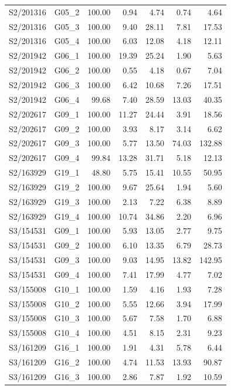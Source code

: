 \begin{longtable}{llrrrrr}
S2/201316 & G05\_2 & 100.00 & 0.94 & 4.74 & 0.74 & 4.64 \\
S2/201316 & G05\_3 & 100.00 & 9.40 & 28.11 & 7.81 & 17.53 \\
S2/201316 & G05\_4 & 100.00 & 6.03 & 12.08 & 4.18 & 12.11 \\
S2/201942 & G06\_1 & 100.00 & 19.39 & 25.24 & 1.90 & 5.63 \\
S2/201942 & G06\_2 & 100.00 & 0.55 & 4.18 & 0.67 & 7.04 \\
S2/201942 & G06\_3 & 100.00 & 6.42 & 10.68 & 7.26 & 17.51 \\
S2/201942 & G06\_4 & 99.68 & 7.40 & 28.59 & 13.03 & 40.35 \\
S2/202617 & G09\_1 & 100.00 & 11.27 & 24.44 & 3.91 & 18.56 \\
S2/202617 & G09\_2 & 100.00 & 3.93 & 8.17 & 3.14 & 6.62 \\
S2/202617 & G09\_3 & 100.00 & 5.77 & 13.50 & 74.03 & 132.88 \\
S2/202617 & G09\_4 & 99.84 & 13.28 & 31.71 & 5.18 & 12.13 \\
S2/163929 & G19\_1 & 48.80 & 5.75 & 15.41 & 10.55 & 50.95 \\
S2/163929 & G19\_2 & 100.00 & 9.67 & 25.64 & 1.94 & 5.60 \\
S2/163929 & G19\_3 & 100.00 & 2.13 & 7.22 & 6.38 & 8.89 \\
S2/163929 & G19\_4 & 100.00 & 10.74 & 34.86 & 2.20 & 6.96 \\
S3/154531 & G09\_1 & 100.00 & 5.93 & 13.05 & 2.77 & 9.75 \\
S3/154531 & G09\_2 & 100.00 & 6.10 & 13.35 & 6.79 & 28.73 \\
S3/154531 & G09\_3 & 100.00 & 9.03 & 14.95 & 13.82 & 142.95 \\
S3/154531 & G09\_4 & 100.00 & 7.41 & 17.99 & 4.77 & 7.02 \\
S3/155008 & G10\_1 & 100.00 & 1.59 & 4.16 & 1.93 & 7.28 \\
S3/155008 & G10\_2 & 100.00 & 5.55 & 12.66 & 3.94 & 17.99 \\
S3/155008 & G10\_3 & 100.00 & 5.67 & 7.58 & 1.70 & 6.88 \\
S3/155008 & G10\_4 & 100.00 & 4.51 & 8.15 & 2.31 & 9.23 \\
S3/161209 & G16\_1 & 100.00 & 1.91 & 4.31 & 5.78 & 6.44 \\
S3/161209 & G16\_2 & 100.00 & 4.74 & 11.53 & 13.93 & 90.87 \\
S3/161209 & G16\_3 & 100.00 & 2.86 & 7.87 & 1.92 & 10.59 \\

\end{longtable}
